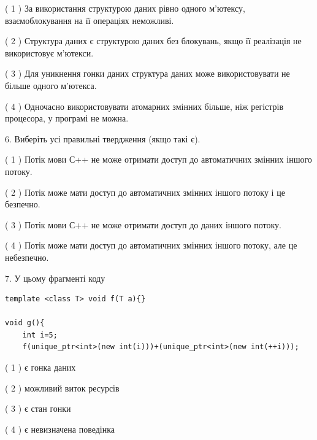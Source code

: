 \documentclass[12pt, ukrainian]{article}
\begin{document}
\begin {large}
{( 1 ) За використання структурою даних рівно одного м’ютексу, взаємоблокування на її операціях неможливі.%

( 2 ) Структура даних є структурою даних без блокувань, якщо її реалізація не використовує м’ютекси.%

( 3 ) Для уникнення гонки даних структура даних може використовувати не більше одного м’ютекса.%

( 4 ) Одночасно використовувати атомарних змінних більше, ніж регістрів процесора, у програмі не можна.%
\newpage



\vspace{5mm}
6. Виберіть усі правильні твердження (якщо такі є).\par
\vspace{2mm}

( 1 ) Потік мови С++ не може отримати доступ до автоматичних змінних іншого потоку.%

( 2 ) Потік може мати доступ до автоматичних змінних іншого потоку і це безпечно.%

( 3 ) Потік мови С++ не може отримати доступ до даних іншого потоку.%

( 4 ) Потік може мати доступ до автоматичних змінних іншого потоку, але це небезпечно.%


\vspace{5mm}
7. У цьому фрагменті коду
\begin{verbatim}
template <class T> void f(T a){}

void g(){
    int i=5;
    f(unique_ptr<int>(new int(i)))+(unique_ptr<int>(new int(++i)));
\end{verbatim}
( 1 ) є гонка даних%

( 2 ) можливий виток ресурсів%

( 3 ) є стан гонки%

( 4 ) є невизначена поведінка%
}
\end {large}
\end{document}
